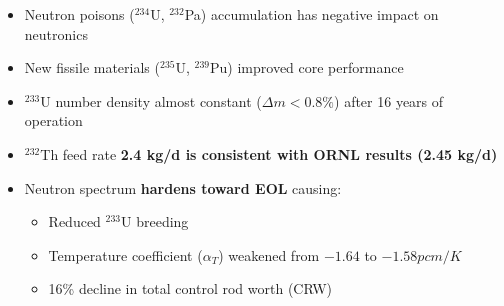\begin{frame}
\begin{textblock*}{12.8cm}
\begin{columns}
	\column[t]{4.5cm}
	\fontsize{7}{9}\selectfont
		\vspace{-3mm}
	\begin{itemize}
		\item<1-> Neutron poisons ($^{234}$U, $^{232}$Pa) accumulation has 
		negative impact on neutronics
		\item<1-> New fissile materials ($^{235}$U, $^{239}$Pu) improved core 
		performance
		\item<1-> $^{233}$U number density almost constant ($\Delta m<0.8\%$) 
		after 16 years of operation
		\item<1-> $^{232}$Th feed rate \textbf{2.4 kg/d is consistent with 
		ORNL results (2.45 kg/d) \cite{betzler_personal_2017}}
		\item<2-> Neutron spectrum \textbf{hardens toward EOL} causing:
		\begin{itemize}
			\item<3-> Reduced $^{233}$U breeding
			\item<4->Temperature coefficient ($\alpha_T$) weakened 
			from $-1.64$ to $-1.58pcm/K$
			\item<5->16\% decline in total control rod worth (CRW)
		\end{itemize} 
	\end{itemize}
\end{columns}
\end{textblock*}
\end{frame}


